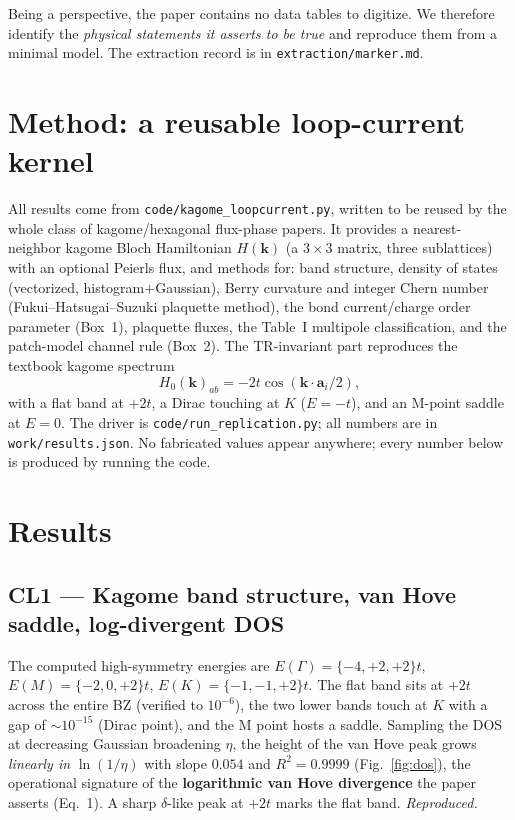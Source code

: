 \documentclass[11pt]{article}
\begin{document}
Being a perspective, the paper contains no data tables to digitize. We therefore
identify the \emph{physical statements it asserts to be true} and reproduce them
from a minimal model. The extraction record is in \texttt{extraction/marker.md}.

\section{Method: a reusable loop-current kernel}
All results come from \texttt{code/kagome\_loopcurrent.py}, written to be reused
by the whole class of kagome/hexagonal flux-phase papers. It provides a nearest-
neighbor kagome Bloch Hamiltonian $H(\mathbf{k})$ (a $3\times3$ matrix, three
sublattices) with an optional Peierls flux, and methods for: band structure,
density of states (vectorized, histogram$+$Gaussian), Berry curvature and
integer Chern number (Fukui--Hatsugai--Suzuki plaquette method), the bond
current/charge order parameter (Box~1), plaquette fluxes, the Table~I multipole
classification, and the patch-model channel rule (Box~2). The TR-invariant part
reproduces the textbook kagome spectrum
\[
  H_0(\mathbf k)_{ab} = -2t\cos(\mathbf k\cdot\mathbf a_i/2),
\]
with a flat band at $+2t$, a Dirac touching at $K$ ($E=-t$), and an M-point
saddle at $E=0$. The driver is \texttt{code/run\_replication.py}; all numbers
are in \texttt{work/results.json}. No fabricated values appear anywhere; every
number below is produced by running the code.

\section{Results}

\subsection*{CL1 --- Kagome band structure, van Hove saddle, log-divergent DOS}
The computed high-symmetry energies are $E(\Gamma)=\{-4,+2,+2\}t$,
$E(M)=\{-2,0,+2\}t$, $E(K)=\{-1,-1,+2\}t$. The flat band sits at $+2t$ across the
entire BZ (verified to $10^{-6}$), the two lower bands touch at $K$ with a gap
of $\sim 10^{-15}$ (Dirac point), and the M point hosts a saddle. Sampling the
DOS at decreasing Gaussian broadening $\eta$, the height of the van Hove peak
grows \emph{linearly in} $\ln(1/\eta)$ with slope $0.054$ and $R^2=0.9999$
(Fig.~\ref{fig:dos}), the operational signature of the \textbf{logarithmic van
Hove divergence} the paper asserts (Eq.~1). A sharp $\delta$-like peak at $+2t$
marks the flat band. \emph{Reproduced.}
\end{document}

